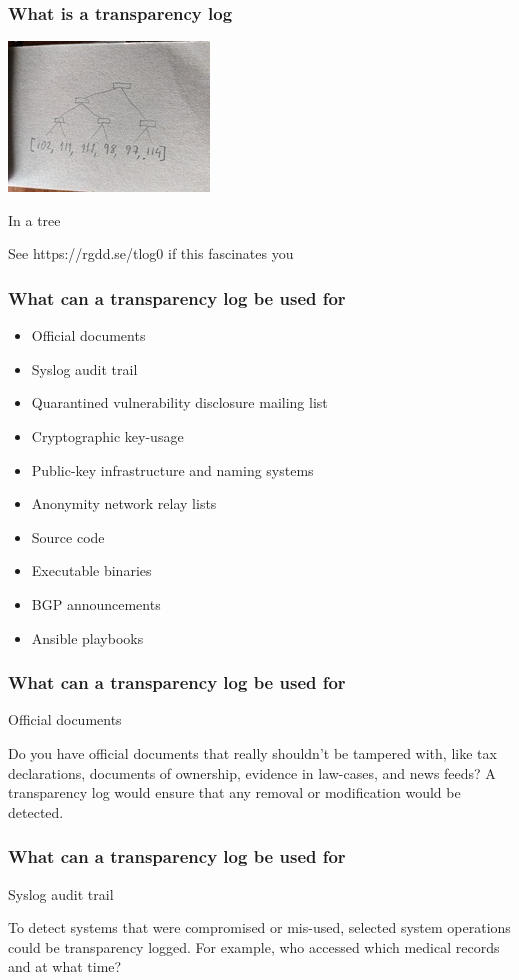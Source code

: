 \begin{frame}
  \frametitle{What is a transparency log}
  \centerline{\includegraphics{img/tree6_s}}
  \centerline{In a tree}
  \pause
  \centerline{See https://rgdd.se/tlog0 if this fascinates you}
\end{frame}

\begin{frame}
  \frametitle{What can a transparency log be used for}

  \begin{itemize}
  \item Official documents
  \item Syslog audit trail
  \item Quarantined vulnerability disclosure mailing list
  \item Cryptographic key-usage
  \item Public-key infrastructure and naming systems
  \item Anonymity network relay lists
  \item Source code
  \item Executable binaries
  \item BGP announcements
  \item Ansible playbooks
  \end{itemize}

\end{frame}

\begin{frame}
  \frametitle{What can a transparency log be used for}

  Official documents
  \pause

  Do you have official documents that really shouldn't be tampered
  with, like tax declarations, documents of ownership, evidence in
  law-cases, and news feeds? A transparency log would ensure that any
  removal or modification would be detected.

\end{frame}

\begin{frame}
  \frametitle{What can a transparency log be used for}

  Syslog audit trail
  \pause

  To detect systems that were compromised or mis-used, selected system
  operations could be transparency logged. For example, who accessed
  which medical records and at what time?
\end{frame}

